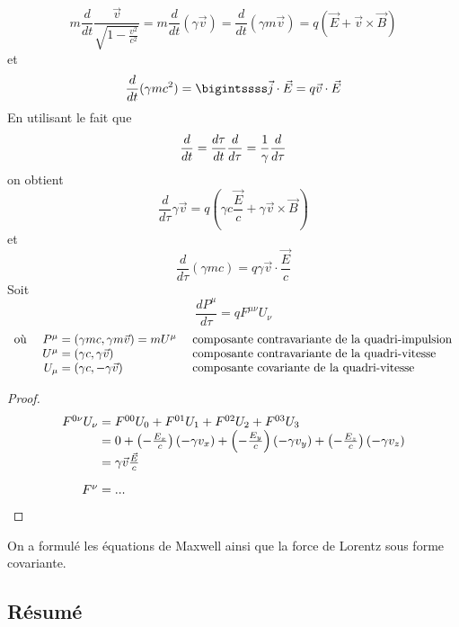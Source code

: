$$
	m\frac{d}{dt}\frac{\vec{v}}{\sqrt{1-\frac{v^2}{c^2}}}=m\frac{d}{dt}(\gamma\vec{v})=\frac{d}{dt}(\gamma m \vec{v})=q(\vec{E}+\vec{v}\times\vec{B})
$$
et
$$
	\frac{d}{dt}(\gamma m c^2)=\bigintssss\vec{j}\cdot\vec{E}=q\vec{v}\cdot\vec{E}
$$
En utilisant le fait que
$$
	\frac{d}{dt}=\frac{d\tau}{dt}\frac{d}{d\tau}=\frac{1}{\gamma}\frac{d}{d\tau}\\
$$
on obtient
$$
	\frac{d}{d\tau}\gamma\vec{v}=q\left(\gamma c\frac{\vec{E}}{c}+\gamma\vec{v}\times\vec{B}\right)
$$
et
$$
	\frac{d}{d\tau}(\gamma mc)=q\gamma\vec{v}\cdot\frac{\vec{E}}{c}
$$
Soit
$$
	\boxed{\frac{dP^\mu}{d\tau}=qF^{\mu\nu}U_\nu}
$$
{\renewcommand*{\arraystretch}{1.2}
$$
	\begin{array}{lr@{\;}ll}
		\text{o\`u }&P^\mu&=(\gamma mc,\gamma m\vec{v})=mU^\mu&\text{ composante contravariante de la quadri-impulsion}\\
		&U^\mu&=(\gamma c,\gamma\vec{v})&\text{ composante contravariante de la quadri-vitesse}\\
		&U_\mu&=(\gamma c,-\gamma\vec{v})&\text{ composante covariante de la quadri-vitesse}
	\end{array}
$$}

\begin{proof}
$$
	\begin{array}{r@{\;}l}
		F^{0\nu}U_\nu&=F^{00}U_0+F^{01}U_1+F^{02}U_2+F^{03}U_3\\
			&=0+\left(-\frac{E_x}{c}\right)(-\gamma v_x)+\left(-\frac{E_y}{c}\right)(-\gamma v_y)+\left(-\frac{E_z}{c}\right)(-\gamma v_z)\\
			&=\gamma\vec{v}\frac{\vec{E}}{c}\\[10pt]
		F^{\nu}&=...
	\end{array}
$$
\end{proof}

\begin{conc}
On a formulé les équations de Maxwell ainsi que la force de Lorentz sous forme covariante.
\end{conc}

\subsection{Résumé}

